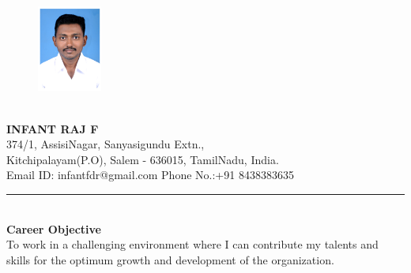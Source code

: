 \documentclass{article}
\begin{document}
	\begin{figure}
		
		\begin{center}
			\includegraphics[width=60pt]{Infantraj}
		\end{center}
	\end{figure}
	\huge \textbf{\\INFANT RAJ F}  \\
	\Large 374/1, AssisiNagar, Sanyasigundu Extn.,\\
	Kitchipalayam(P.O), Salem - 636015, TamilNadu, India.\\
	Email ID: infantfdr@gmail.com Phone No.:+91 8438383635\\
	\hrule 
	
	
	\Large \textbf{\\Career Objective}\\
	\hspace*{20pt} To work in a challenging environment where I can contribute my talents and skills for the optimum growth and development of the organization.
	
\end{document}
